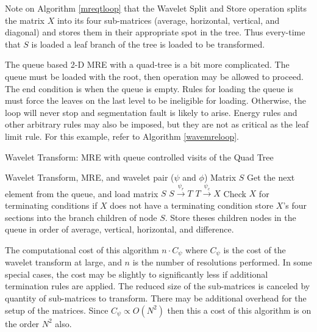 Note on Algorithm \ref{mreqtloop} that the Wavelet Split and Store operation splits the matrix $X$ into its four sub-matrices (average, horizontal, vertical, and diagonal) and stores them in their appropriate spot in the tree.  Thus every-time that $S$ is loaded a leaf branch of the tree is loaded to be transformed.  

The queue based 2-D MRE with a quad-tree is a bit more complicated.  The queue must be loaded with the root, then operation may be allowed to proceed.  The end condition is when the queue is empty.  Rules for loading the queue is must force the leaves on the last level to be ineligible for loading.    Otherwise, the loop will never stop and segmentation fault is likely to arise.  Energy rules and other arbitrary rules may also be imposed, but they are not as critical as the leaf limit rule.  For this example, refer to Algorithm \ref{wavemreloop}.
\begin{algorithm}
\caption {Wavelet Transform: MRE with queue controlled visits of the Quad Tree}
\label{wavemreloop}
\begin {algorithmic}
\REQUIRE Wavelet Transform, MRE, and wavelet pair ($\psi$ and $\phi$)
\REQUIRE Matrix $S$ 
\STATE Get the next element from the queue, and load matrix $S$
\STATE $S \stackrel{\psi_r}{\to} T$
\STATE $T \stackrel{\psi_c}{\to} X$
\STATE Check $X$ for terminating conditions
\STATE if $X$ does not have a terminating condition store $X$'s four sections into the branch children of node $S$.  Store theses children nodes in the queue in order of average, vertical, horizontal, and difference.

\ENDWHILE
\end {algorithmic}
\end{algorithm}
The computational cost of this algorithm $n\cdot C_\psi$  where $C_\psi$ is the cost of the wavelet transform at large, and $n$ is the number of resolutions performed.  In some special cases, the cost may be slightly to significantly less if additional termination rules are applied.  The reduced size of the sub-matrices is canceled by quantity of sub-matrices to transform.  There may be additional overhead for the setup of the matrices.  Since $C_\psi \propto O(N^2)$ then this a cost of this algorithm is on the order $N^2$ also.  


